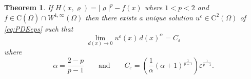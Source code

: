 \documentclass[11pt,reqno]{amsart}
\numberwithin{figure}{section}
\theoremstyle{plain}
\newtheorem{thm}{Theorem}[section]
\theoremstyle{remark}
\numberwithin{equation}{section}
\begin{document}
\begin{thm} If $H(x,\varrho) = |\varrho|^p - f(x)$ where $1<p< 2$ and $f\in \mathrm{C}(\overline{\Omega})\cap W^{1,\infty}(\Omega)$ then there exists a unique solution $u^\varepsilon\in \mathrm{C}^2(\Omega)$ of \eqref{eq:PDEeps} such that
\begin{equation*}
    \lim_{d(x)\to 0} u^\varepsilon(x) \,d(x)^\alpha = C_\varepsilon 
\end{equation*}
where
\begin{equation*}
    \displaystyle\alpha = \frac{2-p}{p-1} \qquad\text{and}\qquad C_\varepsilon = \left(\frac{1}{\alpha}(\alpha+1)^\frac{1}{p-1}\right) \varepsilon^{\frac{1}{p-1}}.
\end{equation*}
\end{thm}
\end{document}

